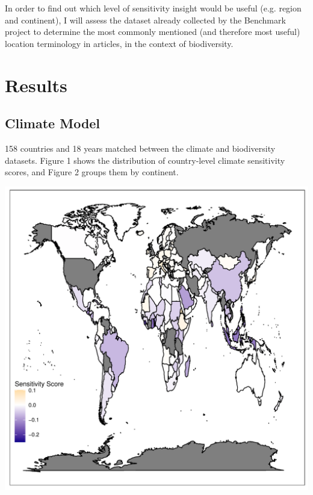 \documentclass[11pt, a4paper, titlepage]{article}
\begin{document}
	In order to find out which level of sensitivity insight would be useful (e.g. region and continent), I will assess the dataset already collected by the Benchmark project to determine the most commonly mentioned (and therefore most useful) location terminology in articles, in the context of biodiversity.
	
	
	
	

	\clearpage

	\section*{Results}
	 
	\subsection*{Climate Model}
	
	158 countries and 18 years matched between the climate and biodiversity datasets. Figure 1 shows the distribution of country-level climate sensitivity scores, and Figure 2 groups them by continent. \newline

	\includegraphics[scale=0.95]{../images/climatesensitivitymapgradient.pdf}
\end{document}
